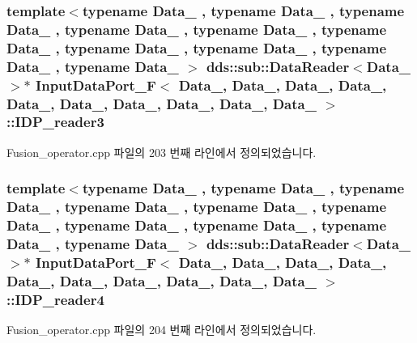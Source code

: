 \subsubsection[{\texorpdfstring{I\+D\+P\+\_\+reader3}{IDP_reader3}}]{\setlength{\rightskip}{0pt plus 5cm}template$<$typename Data\+\_ , typename Data\+\_ , typename Data\+\_ , typename Data\+\_ , typename Data\+\_ , typename Data\+\_ , typename Data\+\_ , typename Data\+\_ , typename Data\+\_ , typename Data\+\_ $>$ dds\+::sub\+::\+Data\+Reader$<$Data\+\_$>$$\ast$ {\bf Input\+Data\+Port\+\_\+F}$<$ Data\+\_, Data\+\_, Data\+\_, Data\+\_, Data\+\_, Data\+\_, Data\+\_, Data\+\_, Data\+\_, Data\+\_ $>$\+::I\+D\+P\+\_\+reader3}\hypertarget{classInputDataPort__F_a3d951f807fddce8487ad9b31586a4ba5}{}\label{classInputDataPort__F_a3d951f807fddce8487ad9b31586a4ba5}


Fusion\+\_\+operator.\+cpp 파일의 203 번째 라인에서 정의되었습니다.

\subsubsection[{\texorpdfstring{I\+D\+P\+\_\+reader4}{IDP_reader4}}]{\setlength{\rightskip}{0pt plus 5cm}template$<$typename Data\+\_ , typename Data\+\_ , typename Data\+\_ , typename Data\+\_ , typename Data\+\_ , typename Data\+\_ , typename Data\+\_ , typename Data\+\_ , typename Data\+\_ , typename Data\+\_ $>$ dds\+::sub\+::\+Data\+Reader$<$Data\+\_$>$$\ast$ {\bf Input\+Data\+Port\+\_\+F}$<$ Data\+\_, Data\+\_, Data\+\_, Data\+\_, Data\+\_, Data\+\_, Data\+\_, Data\+\_, Data\+\_, Data\+\_ $>$\+::I\+D\+P\+\_\+reader4}\hypertarget{classInputDataPort__F_a2257ff7fb24baade0c2f444b5a5605ab}{}\label{classInputDataPort__F_a2257ff7fb24baade0c2f444b5a5605ab}


Fusion\+\_\+operator.\+cpp 파일의 204 번째 라인에서 정의되었습니다.

